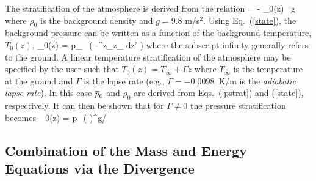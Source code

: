 \documentclass[11pt]{book}
\begin{document}
The stratification of the atmosphere is derived from the relation
\be {} = - \rho_0(z) \, g  \ee
where $\rho_0$ is the background density and $g=9.8$ m/s$^2$. Using Eq.~(\ref{state}), the background pressure can be written as a function of the background temperature, $T_0(z)$,
\be \bp_0(z) = p_\infty \; \exp \, \left( -\int^z_{z_\infty}  dz' \right)  \label{pstrat} \ee
where the subscript infinity generally refers to the ground. A linear temperature stratification of the atmosphere may be
specified by the user such that $T_0(z) = T_\infty + \Gamma z$ where $T_\infty$ is the temperature at the ground and
$\Gamma$ is the lapse rate (e.g., $\Gamma = -0.0098$~K/m is the {\em adiabatic lapse rate}).
In this case $\overline{p}_0$ and $\rho_0$ are derived from Eqs.~(\ref{pstrat}) and (\ref{state}), respectively.
It can then be shown that for $\Gamma \ne 0$ the pressure stratification becomes
\be
   \bp_0(z) = p_\infty  \left(  \right)^{g/\R \Gamma}
   \label{pstrat2}
\ee


\subsection{Combination of the Mass and Energy Equations via the Divergence}
\end{document}
